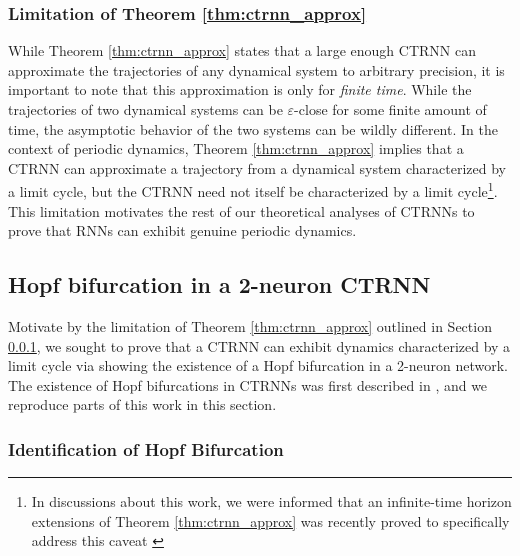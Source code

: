 \documentclass[11pt, letterpaper]{article}
\begin{document}
\subsubsection{Limitation of Theorem \ref{thm:ctrnn_approx}}\label{sec:caveat}

While Theorem \ref{thm:ctrnn_approx} states that a large enough CTRNN can approximate the trajectories of any dynamical system to arbitrary precision, it is important to note that this approximation is only for \textit{finite time}. While the trajectories of two dynamical systems can be $\varepsilon$-close for some finite amount of time, the asymptotic behavior of the two systems can be wildly different. In the context of periodic dynamics, Theorem \ref{thm:ctrnn_approx} implies that a CTRNN can approximate a trajectory from a dynamical system characterized by a limit cycle, but the CTRNN need not itself be characterized by a limit cycle\footnote{In discussions about this work, we were informed that an infinite-time horizon extensions of Theorem \ref{thm:ctrnn_approx} was recently proved to specifically address this caveat \citep{sagodi2026universal}}. This limitation motivates the rest of our theoretical analyses of CTRNNs to prove that RNNs can exhibit genuine periodic dynamics.

\subsection{Hopf bifurcation in a 2-neuron CTRNN}\label{sec:hopf_bif_2_ctrnn}

Motivate by the limitation of Theorem \ref{thm:ctrnn_approx} outlined in Section \ref{sec:caveat}, we sought to prove that a CTRNN can exhibit dynamics characterized by a limit cycle via showing the existence of a Hopf bifurcation in a 2-neuron network. The existence of Hopf bifurcations in CTRNNs was first described in \citet{beer1995dynamics}, and we reproduce parts of this work in this section.

\subsubsection{Identification of Hopf Bifurcation}\label{sec:iden_hopf}
\end{document}
